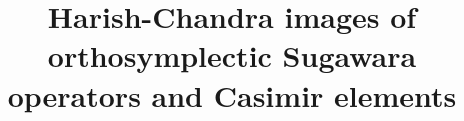 \documentclass[12pt]{article}
\begin{document}
\theoremstyle{definition}
\newtheorem{definition}[thm]{Definition}
\newtheorem{example}[thm]{Example}

\theoremstyle{remark}
\newtheorem{remark}[thm]{Remark}

\newcommand{\bth}{\begin{thm}}
\renewcommand{\eth}{\end{thm}}
\newcommand{\bpr}{\begin{prop}}
\newcommand{\epr}{\end{prop}}
\newcommand{\ble}{\begin{lemma}}
\newcommand{\ele}{\end{lemma}}
\newcommand{\bco}{\begin{cor}}
\newcommand{\eco}{\end{cor}}
\newcommand{\bex}{\begin{example}}
\newcommand{\eex}{\end{example}}
\newcommand{\bde}{\begin{definition}}
\newcommand{\ede}{\end{definition}}
\newcommand{\bre}{\begin{remark}}
\newcommand{\ere}{\end{remark}}
\newcommand{\bcj}{\begin{conj}}
\newcommand{\ecj}{\end{conj}}

\renewcommand{\theequation}{\arabic{section}.\arabic{equation}}




\newcommand{\bpf}{\begin{proof}}
\newcommand{\epf}{\end{proof}}


\def\beql#1{\begin{equation}\label{#1}}

\newcommand{\bal}{\begin{aligned}}
\newcommand{\eal}{\end{aligned}}
\newcommand{\beq}{\begin{equation}}
\newcommand{\eeq}{\end{equation}}
\newcommand{\ben}{\begin{equation*}}
\newcommand{\een}{\end{equation*}}


\title{\Large\bf Harish-Chandra images of orthosymplectic Sugawara operators and Casimir elements}
\end{document}
